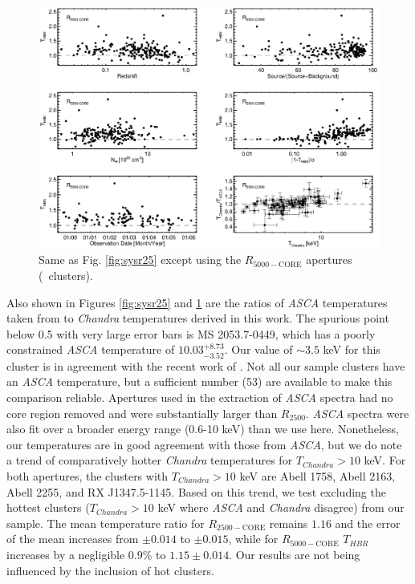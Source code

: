 \begin{figure}
\begin{center}
\includegraphics*[width=\textwidth, trim=0mm 0mm 0mm 0mm, clip]{eband_f5.eps}
\caption[Plot of several possible systematics for
  $R_{5000-\mathrm{CORE}}$ apertures.]{ Same as Fig. \ref{fig:sysr25}
  except using the $R_{5000-\mathrm{CORE}}$ apertures (\ebandnumb\ clusters).}
\label{fig:sysr50}
\end{center}
\end{figure}

Also shown in Figures \ref{fig:sysr25} and \ref{fig:sysr50} are the
ratios of {\it ASCA} temperatures taken from \citet{hornerthesis} to
{\it Chandra} temperatures derived in this work. The spurious point
below 0.5 with very large error bars is MS 2053.7-0449, which has a
poorly constrained {\it ASCA} temperature of
$10.03^{+8.73}_{-3.52}$. Our value of $\sim 3.5$ keV for this cluster
is in agreement with the recent work of
\citet{2008ApJS..174..117M}. Not all our sample clusters have an {\it
  ASCA} temperature, but a sufficient number (53) are available to
make this comparison reliable. Apertures used in the extraction of
{\it ASCA} spectra had no core region removed and were substantially
larger than $R_{2500}$. {\it ASCA} spectra were also fit over a
broader energy range (0.6-10 keV) than we use here. Nonetheless, our
temperatures are in good agreement with those from {\it ASCA}, but we
do note a trend of comparatively hotter {\it Chandra} temperatures for
$T_{Chandra} > 10$ keV. For both apertures, the clusters with
$T_{Chandra} > 10$ keV are Abell 1758, Abell 2163, Abell 2255, and RX
J1347.5-1145. Based on this trend, we test excluding the hottest
clusters ($T_{Chandra} > 10$ keV where {\it ASCA} and {\it Chandra}
disagree) from our sample. The mean temperature ratio for
$R_{2500-\mathrm{CORE}}$ remains $1.16$ and the error of the mean
increases from $\pm 0.014$ to $\pm 0.015$, while for
$R_{5000-\mathrm{CORE}}$ $T_{HBR}$ increases by a negligible $0.9\%$
to $1.15\pm 0.014$. Our results are not being influenced by the
inclusion of hot clusters.

